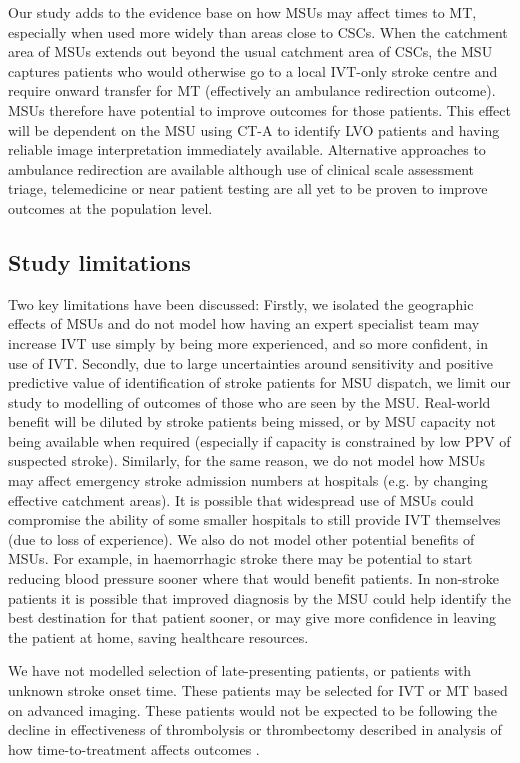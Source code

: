 Our study adds to the evidence base on how MSUs may affect times to MT, especially when used more widely than areas close to CSCs. When the catchment area of MSUs extends out beyond the usual catchment area of CSCs, the MSU captures patients who would otherwise go to a local IVT-only stroke centre and require onward transfer for MT (effectively an ambulance redirection outcome). MSUs therefore have potential to improve outcomes for those patients. This effect will be dependent on the MSU using CT-A to identify LVO patients and having reliable image interpretation immediately available. Alternative approaches to ambulance redirection are available although use of clinical scale assessment triage, telemedicine or near patient testing are all yet to be proven to improve outcomes at the population level.

\subsection{Study limitations}

Two key limitations have been discussed: Firstly, we isolated the geographic effects of MSUs and do not model how having an expert specialist team may increase IVT use simply by being more experienced, and so more confident, in use of IVT. Secondly, due to large uncertainties around sensitivity and positive predictive value of identification of stroke patients for MSU dispatch, we limit our study to modelling of outcomes of those who are seen by the MSU. Real-world benefit will be diluted by stroke patients being missed, or by MSU capacity not being available when required (especially if capacity is constrained by low PPV of suspected stroke). Similarly, for the same reason, we do not model how MSUs may affect emergency stroke admission numbers at hospitals (e.g. by changing effective catchment areas). It is possible that widespread use of MSUs could compromise the ability of some smaller hospitals to still provide IVT themselves (due to loss of experience). We also do not model other potential benefits of MSUs. For example, in haemorrhagic stroke there may be potential to start reducing blood pressure sooner where that would benefit patients. In non-stroke patients it is possible that improved diagnosis by the MSU could help identify the best destination for that patient sooner, or may give more confidence in leaving the patient at home, saving healthcare resources.

We have not modelled selection of late-presenting patients, or patients with unknown stroke onset time. These patients may be selected for IVT or MT based on advanced imaging. These patients would not be expected to be following the decline in effectiveness of thrombolysis or thrombectomy described in analysis of how time-to-treatment affects outcomes \cite{emberson_effect_2014, fransen_time_2016}.

